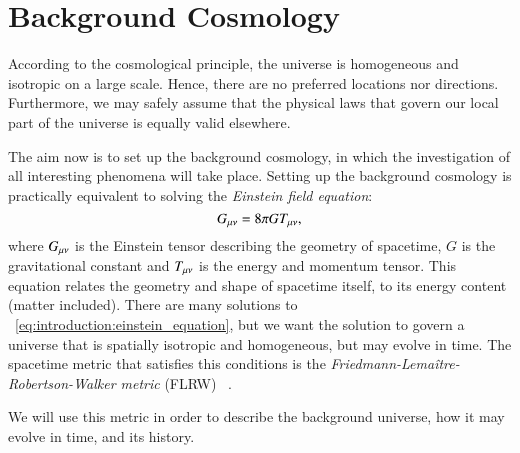 \section{Background Cosmology}\label{sec:m1}

According to the cosmological principle, the universe is homogeneous and isotropic on a large scale. Hence, there are no preferred locations nor directions. Furthermore, we may safely assume that the physical laws that govern our local part of the universe is equally valid elsewhere. 

The aim now is to set up the background cosmology, in which the investigation of all interesting phenomena will take place. Setting up the background cosmology is practically equivalent to solving the \textit{Einstein field equation}:
\begin{equation}\label{eq:introduction:einstein_equation}
    G_{\mu\nu} = 8\pi GT_{\mu\nu},
\end{equation}
where $G_{\mu\nu}$ is the Einstein tensor describing the geometry of spacetime, $G$ is the gravitational constant and $T_{\mu\nu}$ is the energy and momentum tensor. This equation relates the geometry and shape of spacetime itself, to its energy content (matter included). There are many solutions to ~\cref{eq:introduction:einstein_equation}, but we want the solution to govern a universe that is spatially isotropic and homogeneous, but may evolve in time. The spacetime metric that satisfies this conditions is the \textit{Friedmann-Lemaître-Robertson-Walker metric} (FLRW) ~\cite[ch. 8]{carroll_2019}.

We will use this metric in order to describe the background universe, how it may evolve in time, and its history. 



